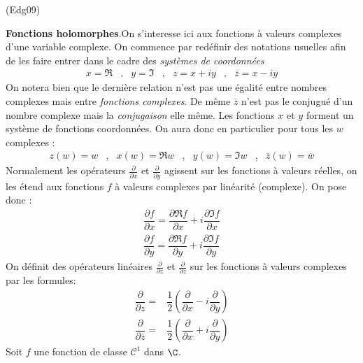 \begin{tiny}(Edg09)\end{tiny}
\textbf{Fonctions holomorphes}.\newline On s'interesse ici aux fonctions à valeurs complexes d'une variable complexe. On commence par redéfinir des notations usuelles afin de les faire entrer dans le cadre des \emph{systèmes de coordonnées} 
\begin{align*}
 x=\Re &,& y=\Im &,& z= x+iy &,& \overline{z}=x-iy
\end{align*}
On notera bien que le dernière relation n'est pas une égalité entre nombres complexes mais entre \emph{fonctions complexes}. De même $\overline{z}$ n'est pas le conjugué d'un nombre complexe mais la \emph{conjugaison} elle même. Les fonctions $x$ et $y$ forment un système de fonctions coordonnées. On aura donc en particulier pour tous les $w$ complexes :
\begin{align*}
 z(w)=w &,& x(w)=\Re w &,& y(w)= \Im w &,& \overline{z}(w)=\overline{w}
\end{align*}
Normalement les opérateurs $\frac{\partial}{\partial x}$ et $\frac{\partial}{\partial y}$ agissent sur les fonctions à valeurs réelles, on les étend aux fonctions $f$ à valeurs complexes par linéarité (complexe). On pose donc :
\begin{align*}
 \dfrac{\partial f}{\partial x} = \dfrac{\partial \Re f}{\partial x} + i\dfrac{\partial \Im f}{\partial x}\\
\dfrac{\partial f}{\partial y} = \dfrac{\partial \Re f}{\partial y} + i\dfrac{\partial \Im f}{\partial y}
\end{align*}
On définit des opérateurs linéaires $\frac{\partial}{\partial z}$ et $\frac{\partial}{\partial \overline{z}}$ sur les fonctions à valeurs complexes par les formules:
\begin{align*}
 \dfrac{\partial}{\partial z} =& \dfrac{1}{2}\left( \dfrac{\partial}{\partial x} - i \dfrac{\partial}{\partial y}\right) \\
\dfrac{\partial}{\partial \overline{z}} =& \dfrac{1}{2}\left( \dfrac{\partial}{\partial x} + i\dfrac{\partial}{\partial y}\right)  
\end{align*}
Soit $f$ une fonction de classe $\mathcal C^1$ dans $\C$. 
